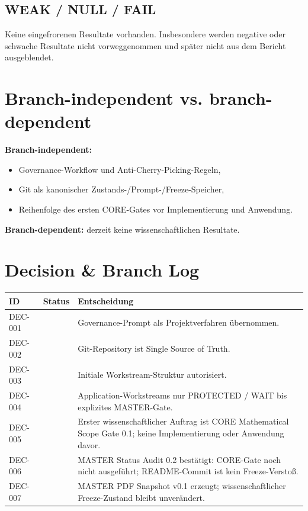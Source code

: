 \documentclass[11pt,a4paper]{article}
\newcommand{\status}[2]{\tcbox[on line,boxrule=0pt,arc=1.5pt,left=4pt,right=4pt,top=2pt,bottom=2pt,colback=#2!12,coltext=#2,fontupper=\bfseries\footnotesize]{#1}}
\newcommand{\STABLE}{\status{STABLE}{green}}
\newcommand{\FROZEN}{\status{FROZEN}{blue}}
\begin{document}
\subsection{WEAK / NULL / FAIL}
Keine eingefrorenen Resultate vorhanden. Insbesondere werden negative oder schwache Resultate nicht vorweggenommen und später nicht aus dem Bericht ausgeblendet.

\section{Branch-independent vs. branch-dependent}

\textbf{Branch-independent:}
\begin{itemize}
\item Governance-Workflow und Anti-Cherry-Picking-Regeln,
\item Git als kanonischer Zustands-/Prompt-/Freeze-Speicher,
\item Reihenfolge des ersten CORE-Gates vor Implementierung und Anwendung.
\end{itemize}

\textbf{Branch-dependent:} derzeit keine wissenschaftlichen Resultate.

\section{Decision \& Branch Log}

\begin{longtable}{p{} p{} p{}}
\toprule
ID & Status & Entscheidung \\
\midrule
DEC-001 & \STABLE & Governance-Prompt als Projektverfahren übernommen. \\
DEC-002 & \STABLE & Git-Repository ist Single Source of Truth. \\
DEC-003 & \STABLE & Initiale Workstream-Struktur autorisiert. \\
DEC-004 & \FROZEN & Application-Workstreams nur PROTECTED / WAIT bis explizites MASTER-Gate. \\
DEC-005 & \status{ACTIVE}{blue} & Erster wissenschaftlicher Auftrag ist CORE Mathematical Scope Gate 0.1; keine Implementierung oder Anwendung davor. \\
DEC-006 & \STABLE & MASTER Status Audit 0.2 bestätigt: CORE-Gate noch nicht ausgeführt; README-Commit ist kein Freeze-Verstoß. \\
DEC-007 & \STABLE & MASTER PDF Snapshot v0.1 erzeugt; wissenschaftlicher Freeze-Zustand bleibt unverändert. \\
\bottomrule
\end{longtable}
\end{document}
